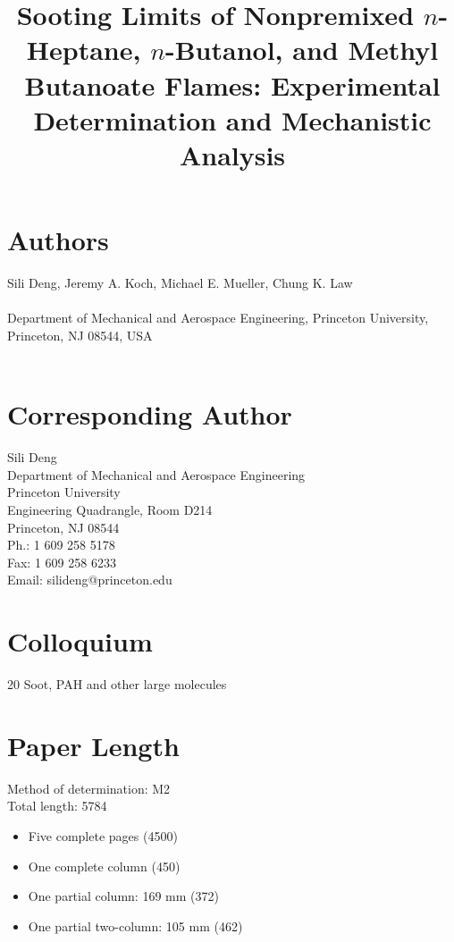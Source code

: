 \documentclass{article}
\title{Sooting Limits of Nonpremixed $n$-Heptane, $n$-Butanol, and Methyl Butanoate Flames: Experimental Determination and Mechanistic Analysis}
\date{}
\begin{document}
\maketitle

\section*{Authors}
Sili Deng, Jeremy A. Koch, Michael E. Mueller, Chung K. Law\\ \\
Department of Mechanical and Aerospace Engineering, Princeton University,
Princeton, NJ 08544, USA\\ \\


\section*{Corresponding Author}
Sili Deng\\
Department of Mechanical and Aerospace Engineering\\
Princeton University\\
Engineering Quadrangle, Room D214\\
Princeton, NJ 08544\\
Ph.: 1 609 258 5178\\
Fax: 1 609 258 6233\\
Email: silideng@princeton.edu

\section*{Colloquium}
20 Soot, PAH and other large molecules

\section*{Paper Length}
Method of determination: M2\\
Total length: 5784\\
\begin{itemize}
  \item Five complete pages (4500)
  \item One complete column (450)
  \item One partial column: 169 mm (372)
  \item One partial two-column: 105 mm (462)
\end{itemize}
\end{document}
